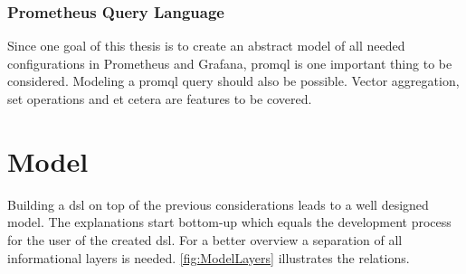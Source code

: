 \subsubsection{Prometheus Query Language}
Since one goal of this thesis is to create an abstract model of all needed configurations in Prometheus and Grafana, \gls{promql} is one important thing to be considered. Modeling a \gls{promql} query should also be possible. Vector aggregation, set operations and et cetera are features to be covered. 


\section{Model}

Building a \gls{dsl} on top of the previous considerations leads to a well designed model. The explanations start bottom-up which equals the development process for the user of the created \gls{dsl}. For a better overview a separation of all informational layers is needed. \cref{fig:ModelLayers} illustrates the relations.

